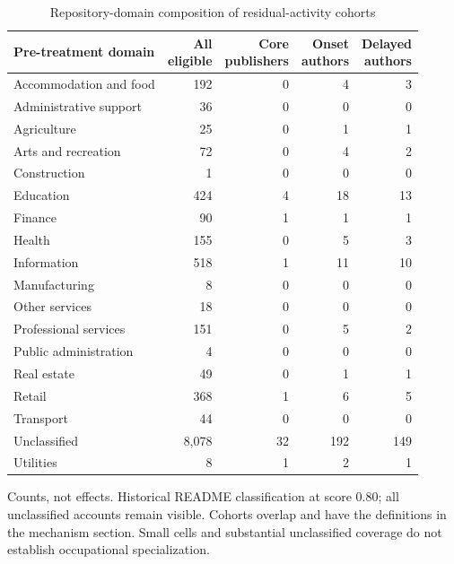 \begin{table}[H]
\centering
\small
\caption{Repository-domain composition of residual-activity cohorts}
\label{tab:residual_domains}
\begin{threeparttable}
\begin{tabular}{@{}p{}rrrr@{}}
\toprule
Pre-treatment domain & \shortstack{All\\eligible} & \shortstack{Core\\publishers} & \shortstack{Onset\\authors} & \shortstack{Delayed\\authors} \\
\midrule
Accommodation and food & 192 & 0 & 4 & 3 \\
Administrative support & 36 & 0 & 0 & 0 \\
Agriculture & 25 & 0 & 1 & 1 \\
Arts and recreation & 72 & 0 & 4 & 2 \\
Construction & 1 & 0 & 0 & 0 \\
Education & 424 & 4 & 18 & 13 \\
Finance & 90 & 1 & 1 & 1 \\
Health & 155 & 0 & 5 & 3 \\
Information & 518 & 1 & 11 & 10 \\
Manufacturing & 8 & 0 & 0 & 0 \\
Other services & 18 & 0 & 0 & 0 \\
Professional services & 151 & 0 & 5 & 2 \\
Public administration & 4 & 0 & 0 & 0 \\
Real estate & 49 & 0 & 1 & 1 \\
Retail & 368 & 1 & 6 & 5 \\
Transport & 44 & 0 & 0 & 0 \\
Unclassified & 8,078 & 32 & 192 & 149 \\
Utilities & 8 & 1 & 2 & 1 \\
\bottomrule
\end{tabular}
\begin{tablenotes}[flushleft]
\footnotesize
\item Counts, not effects. Historical README classification at score 0.80; all unclassified accounts remain visible. Cohorts overlap and have the definitions in the mechanism section. Small cells and substantial unclassified coverage do not establish occupational specialization.
\end{tablenotes}
\end{threeparttable}
\end{table}
